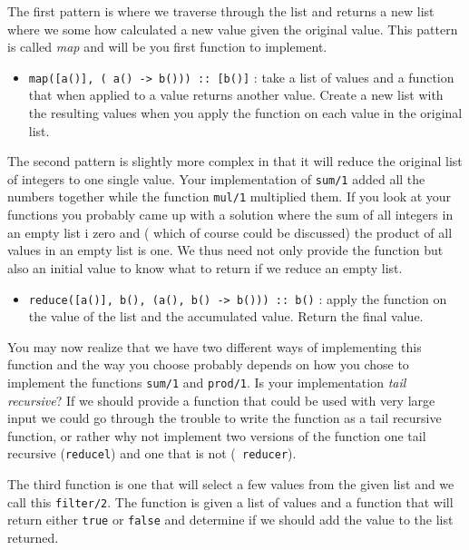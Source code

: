 \documentclass[a4paper,11pt]{article}
\begin{document}
  The first pattern is where we traverse through the list and returns
  a new list where we some how calculated a new value given the
  original value. This pattern is called {\em map} and will be you
  first function to implement.

  \begin{itemize}
  \item {\tt map([a()], ( a() -> b())) :: [b()]} : take a list of values
    and a function that when applied to a value returns another
    value. Create a new list with the resulting values when you apply
    the function on each value in the original list.
  \end{itemize}


  The second pattern is slightly more complex in that it will reduce
  the original list of integers to one single value. Your
  implementation of {\tt sum/1} added all the numbers together while
  the function {\tt mul/1} multiplied them. If you look at your
  functions you probably came up with a solution where the sum of all
  integers in an empty list i zero and ( which of course could be
  discussed) the product of all values in an empty list is one. We
  thus need not only provide the function but also an initial value to
  know what to return if we reduce an empty list.

  \begin{itemize}

  \item {\tt reduce([a()], b(), (a(), b() -> b())) :: b()} : apply the function on the value of the list
    and the accumulated value. Return the final value.

  \end{itemize}

  You may now realize that we have two different ways of implementing
  this function and the way you choose probably depends on how you
  chose to implement the functions {\tt sum/1} and {\tt prod/1}. Is
  your implementation {\em tail recursive}?  If we should provide a
  function that could be used with very large input we could go
  through the trouble to write the function as a tail recursive
  function, or rather why not implement two versions of the function
  one tail recursive ({\tt reducel}) and one that is not ({\tt
    reducer}).

  The third function is one that will select a few values from the
  given list and we call this {\tt filter/2}. The function is given a
  list of values and a function that will return either {\tt true} or
  {\tt false} and determine if we should add the value to the list
  returned.
  
\end{document}
